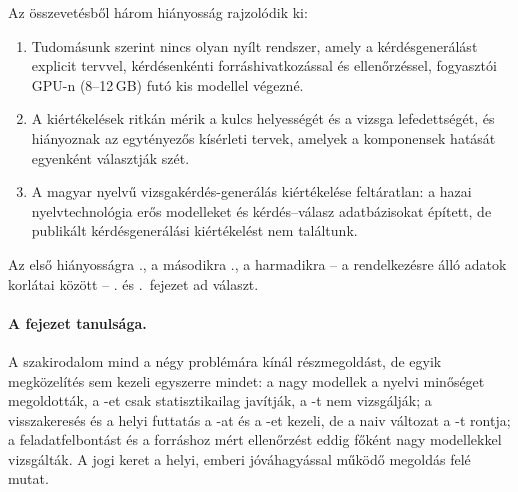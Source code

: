 \noindent\begin{minipage}{\textwidth}
Az összevetésből három hiányosság rajzolódik ki:
\begin{enumerate}[label=(\roman*),leftmargin=*,itemsep=1pt,topsep=2pt]
\item Tudomásunk szerint nincs olyan nyílt rendszer, amely a kérdésgenerálást explicit tervvel,
kérdésenkénti forráshivatkozással és ellenőrzéssel, fogyasztói GPU-n (8--12\,GB) futó kis modellel végezné.
\item A kiértékelések ritkán mérik a kulcs helyességét és a vizsga lefedettségét, és hiányoznak az
egytényezős kísérleti tervek, amelyek a komponensek hatását egyenként választják szét.
\item A magyar nyelvű vizsgakérdés-generálás kiértékelése feltáratlan: a hazai nyelvtechnológia erős
modelleket és kérdés--válasz adatbázisokat épített, de publikált kérdésgenerálási kiértékelést nem
találtunk.
\end{enumerate}
Az első hiányosságra \az{\ref{ch:modszer}}., a másodikra
\az{\ref{ch:kiertekeles}}., a harmadikra -- a rendelkezésre álló adatok korlátai között --
\az{\ref{ch:eredmenyek}}. és \az{\ref{ch:modellek}}.~fejezet ad választ.

\paragraph{A fejezet tanulsága.} A szakirodalom mind a négy problémára kínál részmegoldást, de egyik
megközelítés sem kezeli egyszerre mindet: a nagy modellek a nyelvi minőséget megoldották, a -et csak
statisztikailag javítják, a -t nem vizsgálják; a visszakeresés és a helyi futtatás a -at és a -et
kezeli, de a naiv változat a -t rontja; a feladatfelbontást és a forráshoz mért ellenőrzést eddig főként
nagy modellekkel vizsgálták. A jogi keret a helyi, emberi jóváhagyással működő megoldás felé mutat.
\end{minipage}
